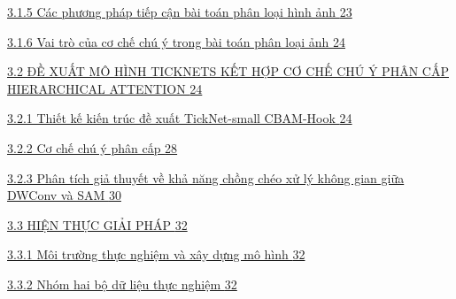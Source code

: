 \documentclass[
  12pt,
  a4paper,
]{report}
\begin{document}
\hyperref[cuxe1c-phux1b0ux1a1ng-phuxe1p-tiux1ebfp-cux1eadn-buxe0i-touxe1n-phuxe2n-loux1ea1i-huxecnh-ux1ea3nh]{3.1.5
Các phương pháp tiếp cận bài toán phân loại hình ảnh
\hyperref[cuxe1c-phux1b0ux1a1ng-phuxe1p-tiux1ebfp-cux1eadn-buxe0i-touxe1n-phuxe2n-loux1ea1i-huxecnh-ux1ea3nh]{23}}

\hyperref[vai-truxf2-cux1ee7a-cux1a1-chux1ebf-chuxfa-uxfd-trong-buxe0i-touxe1n-phuxe2n-loux1ea1i-ux1ea3nh]{3.1.6
Vai trò của cơ chế chú ý trong bài toán phân loại ảnh
\hyperref[vai-truxf2-cux1ee7a-cux1a1-chux1ebf-chuxfa-uxfd-trong-buxe0i-touxe1n-phuxe2n-loux1ea1i-ux1ea3nh]{24}}

\hyperref[ux111ux1ec1-xuux1ea5t-muxf4-huxecnh-ticknets-kux1ebft-hux1ee3p-cux1a1-chux1ebf-chuxfa-uxfd-phuxe2n-cux1ea5p-hierarchical-attention]{3.2
ĐỀ XUẤT MÔ HÌNH TICKNETS KẾT HỢP CƠ CHẾ CHÚ Ý PHÂN CẤP HIERARCHICAL
ATTENTION
\hyperref[ux111ux1ec1-xuux1ea5t-muxf4-huxecnh-ticknets-kux1ebft-hux1ee3p-cux1a1-chux1ebf-chuxfa-uxfd-phuxe2n-cux1ea5p-hierarchical-attention]{24}}

\hyperref[thiux1ebft-kux1ebf-kiux1ebfn-truxfac-ux111ux1ec1-xuux1ea5t-ticknet-small-cbam-hook]{3.2.1
Thiết kế kiến trúc đề xuất TickNet-small CBAM-Hook
\hyperref[thiux1ebft-kux1ebf-kiux1ebfn-truxfac-ux111ux1ec1-xuux1ea5t-ticknet-small-cbam-hook]{24}}

\hyperref[cux1a1-chux1ebf-chuxfa-uxfd-phuxe2n-cux1ea5p]{3.2.2 Cơ chế chú
ý phân cấp \hyperref[cux1a1-chux1ebf-chuxfa-uxfd-phuxe2n-cux1ea5p]{28}}

\hyperref[phuxe2n-tuxedch-giux1ea3-thuyux1ebft-vux1ec1-khux1ea3-nux103ng-chux1ed3ng-chuxe9o-xux1eed-luxfd-khuxf4ng-gian-giux1eefa-dwconv-vuxe0-sam]{3.2.3
Phân tích giả thuyết về khả năng chồng chéo xử lý không gian giữa DWConv
và SAM
\hyperref[phuxe2n-tuxedch-giux1ea3-thuyux1ebft-vux1ec1-khux1ea3-nux103ng-chux1ed3ng-chuxe9o-xux1eed-luxfd-khuxf4ng-gian-giux1eefa-dwconv-vuxe0-sam]{30}}

\hyperref[hiux1ec7n-thux1ef1c-giux1ea3i-phuxe1p]{3.3 HIỆN THỰC GIẢI PHÁP
\hyperref[hiux1ec7n-thux1ef1c-giux1ea3i-phuxe1p]{32}}

\hyperref[muxf4i-trux1b0ux1eddng-thux1ef1c-nghiux1ec7m-vuxe0-xuxe2y-dux1ef1ng-muxf4-huxecnh]{3.3.1
Môi trường thực nghiệm và xây dựng mô hình
\hyperref[muxf4i-trux1b0ux1eddng-thux1ef1c-nghiux1ec7m-vuxe0-xuxe2y-dux1ef1ng-muxf4-huxecnh]{32}}

\hyperref[nhuxf3m-hai-bux1ed9-dux1eef-liux1ec7u-thux1ef1c-nghiux1ec7m]{3.3.2
Nhóm hai bộ dữ liệu thực nghiệm
\hyperref[nhuxf3m-hai-bux1ed9-dux1eef-liux1ec7u-thux1ef1c-nghiux1ec7m]{32}}
\end{document}
